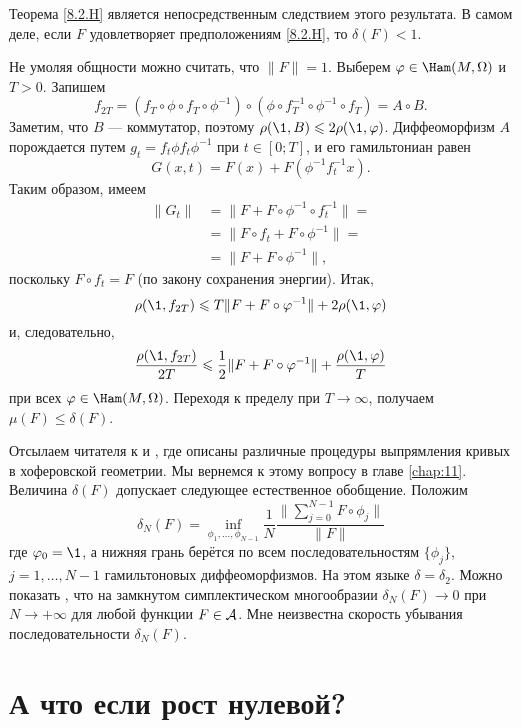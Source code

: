 Теорема \ref{8.2.H} является непосредственным следствием этого
результата. 
В самом деле, если $F$ удовлетворяет предположениям \ref{8.2.H}, то
$\delta (F) <1$. 

Не умоляя общности можно считать, что $\|F \| = 1$.
Выберем $\phi \in \Ham (M, \Omega)$ и $T> 0$.
Запишем 
\[f_{2T}= (f_T \circ \phi \circ f_T \circ \phi^{-1}) \circ (\phi \circ
f_T^{-1} \circ \phi^{-1} \circ f_T) = A \circ B.\] 
Заметим, что $B$ — коммутатор, поэтому $\rho (\1, B) \le 2\rho (\1, \phi)$.
Диффеоморфизм $A$ порождается путем $g_t = f_t \phi f_t \phi ^{-1}$
при $t \in [0;T]$, и его гамильтониан равен  
\[G (x, t) = F (x) + F (\phi^{-1} f_t^{-1} x).\]
Таким образом, имеем 
\begin{align*}
\|G_t \| &= \|F + F \circ \phi ^{-1} \circ f_t ^{-1} \| =
\\
&=\|F \circ f_t + F \circ \phi ^{-1} \| =
\\
&=\|F + F \circ \phi ^{-1} \|,\end{align*}
поскольку $F \circ f_t = F$ (по закону сохранения энергии).
Итак, 
\[\rho (\1, f_{2T}) \le T \| F + F \circ \phi ^{-1} \| + 2\rho (\1, \phi)\]
и, следовательно, 
\[\frac{\rho (\1, f_{2T})}{2T}
\le\frac12 \|F + F \circ \phi ^{-1} \| + \frac{\rho (\1, \phi)}{T}\]
при всех $\phi \in \Ham (M , \Omega)$.
Переходя к пределу при $T \to \infty$, получаем $\mu (F) \le \delta (F)$.
\qeds

Отсылаем читателя к \cite{LM2} и \cite{P9}, где описаны различные
процедуры выпрямления кривых в хоферовской геометрии. 
Мы вернемся к этому вопросу в главе \ref{chap:11}.
Величина $\delta (F)$ допускает следующее естественное обобщение.
Положим 
\[
\delta_N(F)
=
\inf_{\phi_1 ,\dots, \phi_{N-1}}
\frac1N
\frac{\|\sum_{j=0}^{N-1} F \circ \phi_j\|}{\|F\|}
\] 
где $\phi_0 = \1$, а нижняя грань берётся по всем последовательностям
$\{\phi_j\}$, $j = 1,\dots, N-1 $ гамильтоновых диффеоморфизмов. 
На этом языке $\delta = \delta_2$. 
Можно показать \cite{P9}, что на замкнутом симплектическом
многообразии $\delta_N (F) \to 0$ при $N \to + \infty$ для любой
функции $F \in \mathcal{A}$. 
Мне неизвестна скорость убывания последовательности $\delta_N (F)$. 

\section{А что если рост нулевой?}\label{sec:8.4}

